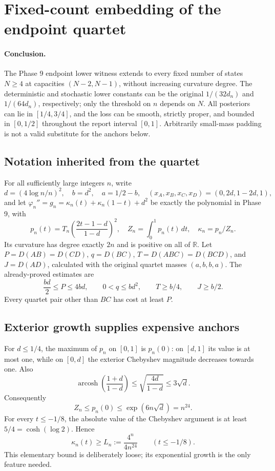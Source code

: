 \section{Fixed-count embedding of the endpoint quartet}

\paragraph{Conclusion.}
The Phase 9 endpoint lower witness extends to every fixed number of
states $N\ge4$ at capacities $(N-2,N-1)$, without increasing curvature
degree. The deterministic and stochastic lower constants can be the
original $1/(32d_n)$ and $1/(64d_n)$, respectively; only the threshold
on $n$ depends on $N$. All posteriors can lie in $[1/4,3/4]$, and the
loss can be smooth, strictly proper, and bounded in $[0,1/2]$ throughout
the report interval $[0,1]$. Arbitrarily small-mass padding is not a
valid substitute for the anchors below.

\subsection{Notation inherited from the quartet}
For all sufficiently large integers $n$, write
\[
 d=(4\log n/n)^2,\quad b=d^2,\quad a=1/2-b,
 \quad (x_A,x_B,x_C,x_D)=(0,2d,1-2d,1),
\]
and let $\varphi_n''=g_n=\kappa_n(t)+\kappa_n(1-t)+d^2$ be exactly
the polynomial in Phase 9, with
\[
 p_n(t)=T_n\!\left(\frac{2t-1-d}{1-d}\right)^2,
 \quad Z_n=\int_0^1p_n(t)\,dt,
 \quad\kappa_n=p_n/Z_n.
\]
Its curvature has degree exactly $2n$ and is positive on all of
$\mathbb R$. Let $P=D(AB)=D(CD)$, $q=D(BC)$,
$T=D(ABC)=D(BCD)$, and $J=D(AD)$, calculated with the original
quartet masses $(a,b,b,a)$. The already-proved estimates are
\[
 \frac{bd}{2}\le P\le4bd,\qquad
 0<q\le bd^2,\qquad T\ge b/4,\qquad J\ge b/2.
\]
Every quartet pair other than $BC$ has cost at least $P$.

\subsection{Exterior growth supplies expensive anchors}
For $d\le1/4$, the maximum of $p_n$ on $[0,1]$ is $p_n(0)$:
on $[d,1]$ its value is at most one, while on $[0,d]$ the exterior
Chebyshev magnitude decreases towards one. Also
\[
 \operatorname{arcosh}\!\left(\frac{1+d}{1-d}\right)
 \le\sqrt{\frac{4d}{1-d}}\le3\sqrt d.
\]
Consequently
\[
 Z_n\le p_n(0)\le \exp(6n\sqrt d)=n^{24}.
\]
For every $t\le-1/8$, the absolute value of the Chebyshev argument
is at least $5/4=\cosh(\log2)$. Hence
\begin{equation}
 \kappa_n(t)\ge L_n:=\frac{4^n}{4n^{24}}
 \qquad(t\le-1/8).
 \tag{A1}
\end{equation}
This elementary bound is deliberately loose; its exponential growth is
the only feature needed.

